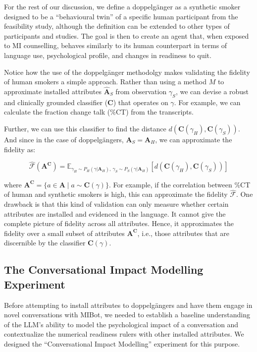 For the rest of our discussion, we define a doppelgänger as a synthetic smoker designed to be a ``behavioural twin'' of a specific human participant from the feasibility study, although the definition can be extended to other types of participants and studies. The goal is then to create an agent that, when exposed to MI counselling, behaves similarly to its human counterpart in terms of language use, psychological profile, and changes in readiness to quit.

Notice how the use of the doppelgänger methodolgy makes validating the fidelity of human smokers a simple approach. Rather than using a method $M$ to approximate installed attributes $\hat{\textbf{A}}_S$ from observation $\gamma_S$, we can devise a robust and clinically grounded classifier ($\textbf{C}$) that operates on $\gamma$. For example, we can calculate the fraction change talk (\%CT) from the transcripts. 

Further, we can use this classifier to find the distance $d(\textbf{C}(\gamma_H), \textbf{C}(\gamma_S))$. And since in the case of doppelgängers, $\textbf{A}_S = \textbf{A}_H$, we can approximate the fidelity as:

$$\hat{\mathcal{F}}(\textbf{A}^\textbf{C}) = \mathbb{E}_{\gamma_H \sim P_H (\gamma | \textbf{A}_H),  \:  \gamma_S \sim P_S(\gamma | \textbf{A}_H)}[d(
\textbf{C}(\gamma_H),\textbf{C}(\gamma_S)
)]$$


where $\textbf{A}^\textbf{C} = \{a \in \textbf{A} \mid a \sim \textbf{C}(\gamma)\}$. For example, if the correlation between \%CT of human and synthetic smokers is high, this can approximate the fidelity $\hat{\mathcal{F}}$. One drawback is that this kind of validation can only measure whether certain attributes are installed and evidenced in the language. It cannot give the complete picture of fidelity across all attributes. Hence, it approximates the fidelity over a small subset of attributes $\textbf{A}^\textbf{C}$, i.e., those attributes that are discernible by the classifier $\textbf{C}(\gamma)$.



\subsection{The Conversational Impact Modelling Experiment}
\label{sec:transcript-autoplay}
Before attempting to install attributes to doppelgängers and have them engage in novel conversations with MIBot, we needed to establish a baseline understanding of the LLM's ability to model the psychological impact of a conversation and contextualize the numerical readiness rulers with other installed attributes. We designed the ``Conversational Impact Modelling'' experiment for this purpose.

